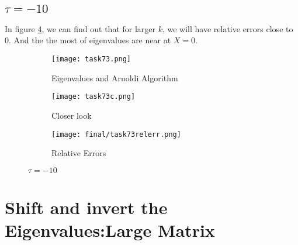 \documentclass{article}
\begin{document}
\subsection{$\tau = -10$}
\begin{flushleft}
In figure \ref{fig:task73}, we can find out that for larger $k$, we will have relative errors close to $0$. And the the most of eigenvalues are near at $X=0$.
\end{flushleft}
\begin{figure}[H]
    \centering
    \begin{subfigure}{0.5\textwidth}
        \centering
        \texttt{[image: task73.png]}
        \caption{Eigenvalues and Arnoldi Algorithm}
        \label{fig:task73e}
    \end{subfigure}
    
    \begin{subfigure}{0.5\textwidth}
        \centering
        \texttt{[image: task73c.png]}
        \caption{Closer look}
        \label{fig:task73ec}
    \end{subfigure}
    
    \begin{subfigure}{0.4\textwidth}
        \centering
        \texttt{[image: final/task73relerr.png]}
        \caption{Relative Errors}
        \label{fig:task73relerr}
    \end{subfigure}
    \caption{$\tau=-10$}
    \label{fig:task73}
\end{figure}
\section{Shift and invert the Eigenvalues:Large Matrix}
\end{document}
